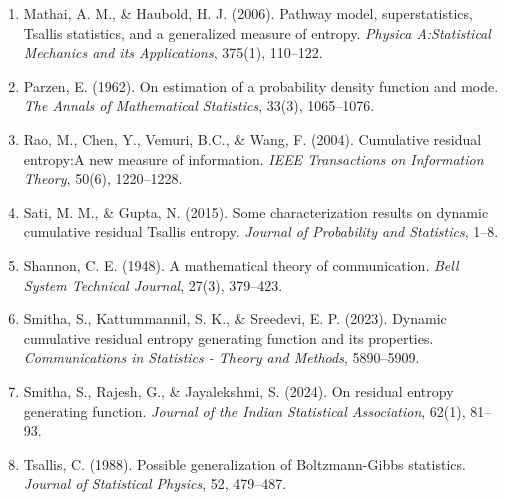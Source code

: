 \documentclass[11pt,reqno]{amsart}
\theoremstyle{tight}
\begin{document}
\begin{enumerate}
\item    Mathai, A. M., \& Haubold, H. J. (2006). Pathway model, superstatistics, Tsallis statistics, and a generalized measure of entropy. \textit{Physica A:Statistical Mechanics and its Applications}, 375(1), 110--122.
\item Parzen, E. (1962). On estimation of a probability density function and mode. \textit{The Annals of Mathematical Statistics}, 33(3), 1065--1076.
\item Rao, M., Chen, Y., Vemuri, B.C., \& Wang, F. (2004). Cumulative residual entropy:A new measure of information. \textit{IEEE Transactions on Information Theory}, 50(6), 1220--1228.

\item Sati, M. M., \& Gupta, N. (2015). Some characterization results on dynamic cumulative residual Tsallis entropy. \textit{Journal of Probability and Statistics}, 1--8.
\item   Shannon, C. E. (1948). A mathematical theory of communication. \textit{Bell System Technical Journal}, 27(3), 379--423.
\item Smitha, S., Kattummannil, S. K., \& Sreedevi, E. P. (2023). Dynamic cumulative residual entropy generating function and its properties. \textit{Communications in Statistics - Theory and Methods}, 5890--5909.
\item Smitha, S., Rajesh, G., \& Jayalekshmi, S. (2024). On residual entropy generating function. \textit{Journal of the Indian Statistical Association}, 62(1), 81--93.%
\item Tsallis, C. (1988). Possible generalization of Boltzmann-Gibbs statistics. \textit{Journal of Statistical Physics}, 52,  479--487.

\end{enumerate}
\end{document}
